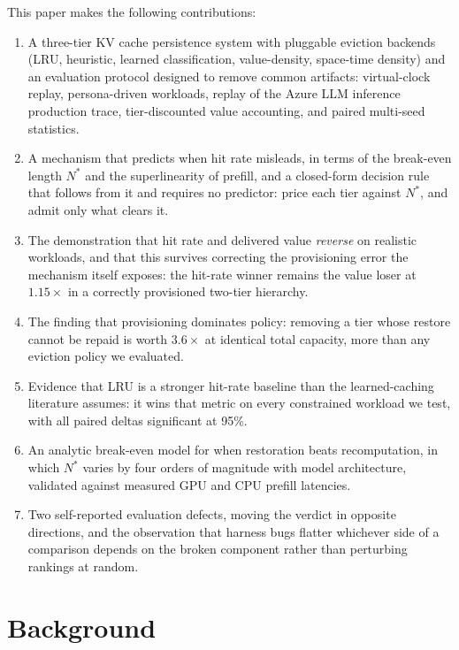 \documentclass[letterpaper,twocolumn,10pt]{article}
\begin{document}
This paper makes the following contributions:
\begin{enumerate}
  \item A three-tier KV cache persistence system with pluggable eviction backends (LRU, heuristic, learned classification, value-density, space-time density) and an evaluation protocol designed to remove common artifacts: virtual-clock replay, persona-driven workloads, replay of the Azure LLM inference production trace, tier-discounted value accounting, and paired multi-seed statistics.
  \item A mechanism that predicts when hit rate misleads, in terms of the break-even length $N^{*}$ and the superlinearity of prefill, and a closed-form decision rule that follows from it and requires no predictor: price each tier against $N^{*}$, and admit only what clears it.
  \item The demonstration that hit rate and delivered value \emph{reverse} on realistic workloads, and that this survives correcting the provisioning error the mechanism itself exposes: the hit-rate winner remains the value loser at $1.15\times$ in a correctly provisioned two-tier hierarchy.
  \item The finding that provisioning dominates policy: removing a tier whose restore cannot be repaid is worth $3.6\times$ at identical total capacity, more than any eviction policy we evaluated.
  \item Evidence that LRU is a stronger hit-rate baseline than the learned-caching literature assumes: it wins that metric on every constrained workload we test, with all paired deltas significant at 95\%.
  \item An analytic break-even model for when restoration beats recomputation, in which $N^{*}$ varies by four orders of magnitude with model architecture, validated against measured GPU and CPU prefill latencies.
  \item Two self-reported evaluation defects, moving the verdict in opposite directions, and the observation that harness bugs flatter whichever side of a comparison depends on the broken component rather than perturbing rankings at random.
\end{enumerate}

\section{Background}
\end{document}
